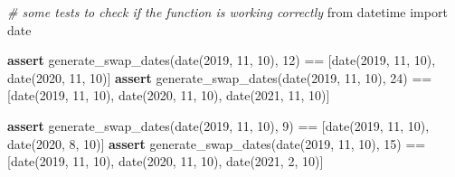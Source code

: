 \documentclass[11pt]{article}
\newenvironment{Shaded}{}{}
\newcommand{\DecValTok}[1]{\textcolor[rgb]{0.25,0.63,0.44}{{#1}}}
\newcommand{\CommentTok}[1]{\textcolor[rgb]{0.38,0.63,0.69}{\textit{{#1}}}}
\newcommand{\NormalTok}[1]{{#1}}
\newcommand{\ImportTok}[1]{{#1}}
\newcommand{\ControlFlowTok}[1]{\textcolor[rgb]{0.00,0.44,0.13}{\textbf{{#1}}}}
\newcommand{\OperatorTok}[1]{\textcolor[rgb]{0.40,0.40,0.40}{{#1}}}
\begin{document}
\begin{Shaded}
\begin{Highlighting}[]
\CommentTok{# some tests to check if the function is working correctly}
\ImportTok{from}\NormalTok{ datetime }\ImportTok{import}\NormalTok{ date}

\ControlFlowTok{assert}\NormalTok{ generate_swap_dates(date(}\DecValTok{2019}\NormalTok{, }\DecValTok{11}\NormalTok{, }\DecValTok{10}\NormalTok{), }\DecValTok{12}\NormalTok{) }\OperatorTok{==}\NormalTok{ [date(}\DecValTok{2019}\NormalTok{, }\DecValTok{11}\NormalTok{, }\DecValTok{10}\NormalTok{), }
\NormalTok{                                                       date(}\DecValTok{2020}\NormalTok{, }\DecValTok{11}\NormalTok{, }\DecValTok{10}\NormalTok{)]}
\ControlFlowTok{assert}\NormalTok{ generate_swap_dates(date(}\DecValTok{2019}\NormalTok{, }\DecValTok{11}\NormalTok{, }\DecValTok{10}\NormalTok{), }\DecValTok{24}\NormalTok{) }\OperatorTok{==}\NormalTok{ [date(}\DecValTok{2019}\NormalTok{, }\DecValTok{11}\NormalTok{, }\DecValTok{10}\NormalTok{), }
\NormalTok{                                                       date(}\DecValTok{2020}\NormalTok{, }\DecValTok{11}\NormalTok{, }\DecValTok{10}\NormalTok{), }
\NormalTok{                                                       date(}\DecValTok{2021}\NormalTok{, }\DecValTok{11}\NormalTok{, }\DecValTok{10}\NormalTok{)]}

\ControlFlowTok{assert}\NormalTok{ generate_swap_dates(date(}\DecValTok{2019}\NormalTok{, }\DecValTok{11}\NormalTok{, }\DecValTok{10}\NormalTok{), }\DecValTok{9}\NormalTok{) }\OperatorTok{==}\NormalTok{ [date(}\DecValTok{2019}\NormalTok{, }\DecValTok{11}\NormalTok{, }\DecValTok{10}\NormalTok{), }
\NormalTok{                                                      date(}\DecValTok{2020}\NormalTok{, }\DecValTok{8}\NormalTok{, }\DecValTok{10}\NormalTok{)]}
\ControlFlowTok{assert}\NormalTok{ generate_swap_dates(date(}\DecValTok{2019}\NormalTok{, }\DecValTok{11}\NormalTok{, }\DecValTok{10}\NormalTok{), }\DecValTok{15}\NormalTok{) }\OperatorTok{==}\NormalTok{ [date(}\DecValTok{2019}\NormalTok{, }\DecValTok{11}\NormalTok{, }\DecValTok{10}\NormalTok{), }
\NormalTok{                                                       date(}\DecValTok{2020}\NormalTok{, }\DecValTok{11}\NormalTok{, }\DecValTok{10}\NormalTok{), }
\NormalTok{                                                       date(}\DecValTok{2021}\NormalTok{, }\DecValTok{2}\NormalTok{, }\DecValTok{10}\NormalTok{)]}
\end{Highlighting}
\end{Shaded}
\end{document}
